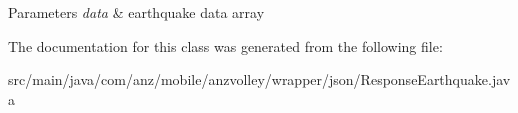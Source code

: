 \begin{DoxyParams}{Parameters}
{\em data} & earthquake data array \\
\hline
\end{DoxyParams}


The documentation for this class was generated from the following file\+:\begin{DoxyCompactItemize}
\item 
src/main/java/com/anz/mobile/anzvolley/wrapper/json/Response\+Earthquake.\+java\end{DoxyCompactItemize}
